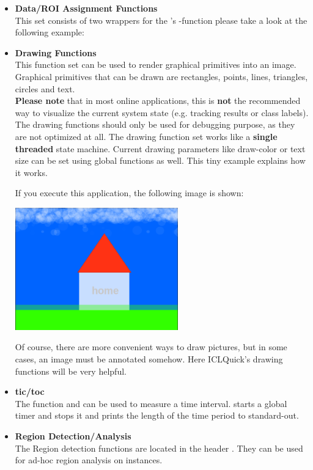 \begin{itemize}
\item \textbf{Data/ROI Assignment Functions}\\
This set consists of two wrappers for the 's -function please take a look at the following example:


\item \textbf{Drawing Functions}\\
This function set can be used to render graphical primitives into an image. Graphical primitives that can be drawn are rectangles, points, lines, triangles, circles and text.\\
\textbf{Please note} that in most online applications, this is \textbf{not} the recommended way to visualize the current system state (e.g. tracking results or class labels). The drawing functions should only be used for debugging purpose, as they are not optimized at all. The drawing function set works like a \textbf{single threaded} state machine. Current drawing parameters like draw-color or text size can be set using global functions as well. This tiny example explains how it works.


If you execute this application, the following image is shown:

\includegraphics[width=200pt]{media/quick-house.png}

Of course, there are more convenient ways to draw pictures, but in some cases, an image must be annotated somehow. Here ICLQuick's drawing functions will be very helpful.

\item \textbf{tic/toc}\\
The function  and  can be used to measure a time interval.  starts a global timer and  stops it and prints the length of the time period to standard-out. 

\item \textbf{Region Detection/Analysis}\\
The Region detection functions are located in the header . They can be used for ad-hoc region analysis on  instances. 
\end{itemize}


